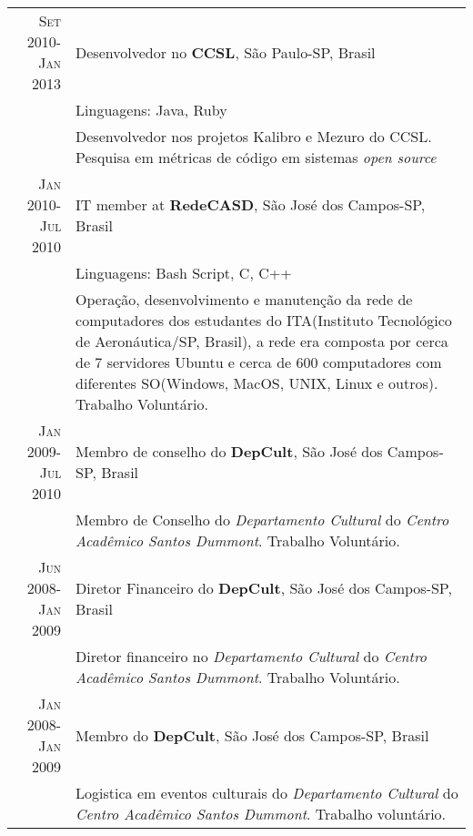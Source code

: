\documentclass[a4paper,10pt]{article} %
\begin{document}
\begin{tabular}{r|p{11cm}}

\textsc{Set 2010-Jan 2013} & Desenvolvedor no \textbf{CCSL}, São Paulo-SP, Brasil \emph{}\\
& \footnotesize{Linguagens: Java, Ruby}\\
       & \footnotesize{Desenvolvedor nos projetos Kalibro e Mezuro do CCSL. Pesquisa em métricas de código em
       sistemas \emph{open source}}
\multicolumn{2}{c}{} \\


\textsc{Jan 2010-Jul 2010} & IT member at \textbf{RedeCASD}, São José dos Campos-SP, Brasil \emph{}\\
& \footnotesize{Linguagens: Bash Script, C, C++}\\
       & \footnotesize{Operação, desenvolvimento e manutenção da rede de computadores dos estudantes do ITA(Instituto
       Tecnológico de Aeronáutica/SP, Brasil), a rede era composta por cerca de 7 servidores Ubuntu e cerca
       de 600 computadores com diferentes SO(Windows, MacOS, UNIX, Linux e outros). Trabalho Voluntário.}
       
\multicolumn{2}{c}{} \\


\textsc{Jan 2009-Jul 2010} & Membro de conselho do \textbf{DepCult}, São José dos Campos-SP, Brasil \emph{}\\
& \footnotesize{Membro de Conselho do \textit{Departamento Cultural} do 
       \emph{Centro Acadêmico Santos Dummont}. Trabalho Voluntário.}
\multicolumn{2}{c}{} \\



\textsc{Jun 2008-Jan 2009} & Diretor Financeiro do \textbf{DepCult}, São José dos Campos-SP, Brasil \emph{}\\
& \footnotesize{Diretor financeiro no \emph{Departamento Cultural} do 
       \emph{Centro Acadêmico Santos Dummont}. Trabalho Voluntário.}
\multicolumn{2}{c}{} \\



\textsc{Jan 2008-Jan 2009} & Membro do \textbf{DepCult}, São José dos Campos-SP, Brasil \emph{}\\
& \footnotesize{Logistica em eventos culturais do \emph{Departamento Cultural} do \emph{Centro Acadêmico Santos Dummont}. Trabalho voluntário.}

\end{tabular}
\end{document}
